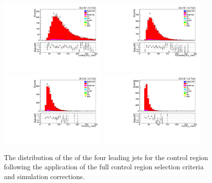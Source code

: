 \begin{figure}[h]
\centering
\includegraphics[width=0.47\textwidth]{figs/background-estimation/plots/unblinded/ttbar_control/leadingJetPt_SingleTop_wMass_emu.pdf}
\includegraphics[width=0.47\textwidth]{figs/background-estimation/plots/unblinded/ttbar_control/secondJetPt_SingleTop_wMass_emu.pdf}
\\
\includegraphics[width=0.47\textwidth]{figs/background-estimation/plots/unblinded/ttbar_control/thirdJetPt_SingleTop_wMass_emu.pdf}
\includegraphics[width=0.47\textwidth]{figs/background-estimation/plots/unblinded/ttbar_control/fourthJetPt_SingleTop_wMass_emu.pdf}
\caption{
The distribution of the \pt of the four leading jets for the \ttbar control region following the application of the full control region selection criteria and simulation corrections.
}
\label{fig:ttbarCR_jetPt}
\end{figure}

